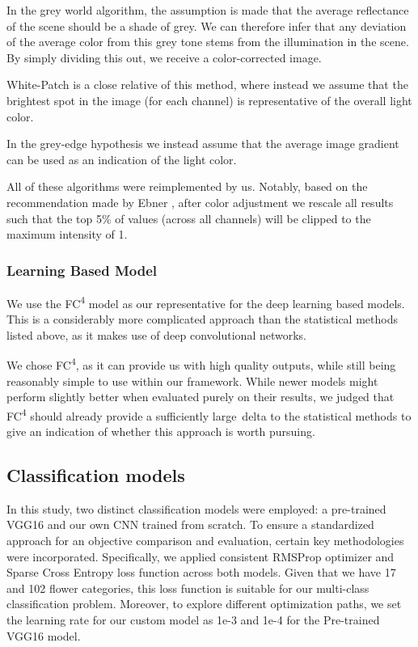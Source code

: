 In the grey world algorithm, the assumption is made that the average reflectance of the scene should
be a shade of grey. We can therefore infer that any deviation of the average color from this grey tone stems from
the illumination in the scene. By simply dividing this out, we receive a color-corrected image.

White-Patch is a close relative of this method, where instead we assume that the brightest spot in the image (for each channel)
is representative of the overall light color.

In the grey-edge hypothesis we instead assume that the average image gradient can be used as an indication of the light color.

All of these algorithms were reimplemented by us. Notably, based on the recommendation made by Ebner \cite{EbnerConstancy},
after color adjustment we rescale all results such that the top 5\% of values (across all channels) will be clipped to
the maximum intensity of 1.

\subsubsection{Learning Based Model}

We use the FC\textsuperscript{4} model\cite{hu2017fc} as our representative for the deep learning based models. This is a considerably more complicated approach
than the statistical methods listed above, as it makes use of deep convolutional networks.

We chose FC\textsuperscript{4}, as it can provide us with high quality outputs, while still being reasonably simple to use within our framework. While newer
models might perform slightly better when evaluated purely on their results, we judged that FC\textsuperscript{4} should already provide a sufficiently large\
delta to the statistical methods to give an indication of whether this approach is worth pursuing.

\subsection{Classification models}

In this study, two distinct classification models were employed: a pre-trained VGG16 \cite{SimonyanVGG} and our own \gls{CNN} trained from scratch.
To ensure a standardized approach for an objective comparison and evaluation, certain key methodologies were incorporated.
Specifically, we applied consistent RMSProp optimizer and Sparse Cross Entropy loss function across both models.
Given that we have 17 and 102 flower categories, this loss function is suitable for our multi-class classification problem. Moreover, to explore different optimization paths, we set the learning rate
for our custom model as 1e-3 and 1e-4 for the Pre-trained VGG16 model.

